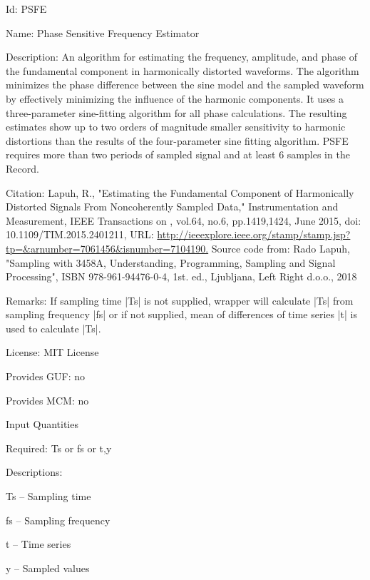 \begin{tightdesc}
\item [Id:] PSFE
\item [Name:] Phase Sensitive Frequency Estimator
\item [Description:] An algorithm for estimating the frequency, amplitude, and phase of the fundamental component in harmonically distorted waveforms. The algorithm minimizes the phase difference between the sine model and the sampled waveform by effectively minimizing the influence of the harmonic components. It uses a three-parameter sine-fitting algorithm for all phase calculations. The resulting estimates show up to two orders of magnitude smaller sensitivity to harmonic distortions than the results of the four-parameter sine fitting algorithm. PSFE requires more than two periods of sampled signal and at least 6 samples in the Record.
\item [Citation:] Lapuh, R., "Estimating the Fundamental Component of Harmonically Distorted Signals From Noncoherently Sampled Data," Instrumentation and Measurement, IEEE Transactions on , vol.64, no.6, pp.1419,1424, June 2015, doi: 10.1109/TIM.2015.2401211, URL: \url{http://ieeexplore.ieee.org/stamp/stamp.jsp?tp=\&arnumber=7061456\&isnumber=7104190.} Source code from: Rado Lapuh, "Sampling with 3458A, Understanding, Programming, Sampling and Signal Processing", ISBN 978-961-94476-0-4, 1st. ed., Ljubljana, Left Right d.o.o., 2018
\item [Remarks:] If sampling time |Ts| is not supplied, wrapper will calculate |Ts| from sampling frequency |fs| or if not supplied, mean of differences of time series |t| is used to calculate |Ts|.
\item [License:] MIT License
\item [Provides GUF:] no
\item [Provides MCM:] no
\item [Input Quantities] \rule{0em}{0em}
    \begin{tightdesc}
    \item [Required:] 
        \textsf{Ts} or \textsf{fs} or \textsf{t},\enspace \textsf{y}
    \item [Descriptions:] \rule{0em}{0em}
        \begin{tightdesc}
            \item[\textsf{Ts}] -- Sampling time
            \item[\textsf{fs}] -- Sampling frequency
            \item[\textsf{t}] -- Time series
            \item[\textsf{y}] -- Sampled values

\end{tightdesc}
\end{tightdesc}
\end{tightdesc}
